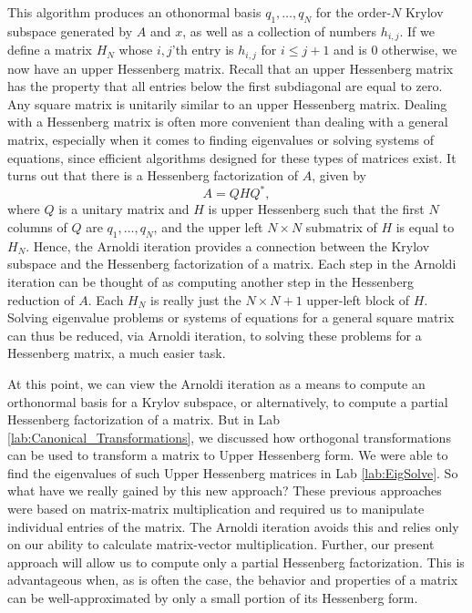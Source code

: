 This algorithm produces an othonormal basis $q_1,\ldots,q_N$ for the order-$N$ Krylov subspace generated by $A$ and $x$, as well
as a collection of numbers $h_{i,j}$. If we define a matrix $H_N$ whose $i,j$'th entry is $h_{i,j}$ for $i \leq j+1$ and
is $0$ otherwise, we now have an upper Hessenberg matrix.
Recall that an upper Hessenberg matrix has the property that all entries below the first subdiagonal
are equal to zero. Any square matrix is unitarily similar to an upper Hessenberg matrix. Dealing with a Hessenberg matrix is
often more convenient than dealing with a general matrix, especially when it comes to finding eigenvalues or solving systems
of equations, since efficient algorithms designed for these types of matrices exist.
It turns out that there is a Hessenberg factorization of $A$, given by
\[
A  = QHQ^*,
\]
where $Q$ is a unitary matrix and $H$ is upper Hessenberg such that the first $N$ columns of $Q$ are $q_1,\ldots,q_N$, and
the upper left $N \times N$ submatrix of $H$ is equal to $H_N$. Hence, the Arnoldi iteration provides a connection between
the Krylov subspace and the Hessenberg factorization of a matrix. Each step in the Arnoldi iteration can be thought of as computing
another step in the Hessenberg reduction of $A$. Each $H_N$ is really just the $N \times N + 1$ upper-left block of $H$.
Solving eigenvalue problems or systems of equations for
a general square matrix can thus be reduced, via Arnoldi iteration, to solving these problems for a Hessenberg matrix,
a much easier task.

At this point, we can view the Arnoldi iteration as a means to compute an orthonormal basis for a Krylov subspace, or
alternatively, to compute a partial Hessenberg factorization of a matrix.
But in Lab \ref{lab:Canonical_Transformations}, we discussed how orthogonal transformations can be used to transform a matrix to Upper
Hessenberg form.
We were able to find the eigenvalues of such Upper Hessenberg matrices in Lab \ref{lab:EigSolve}.
So what have we really gained by this new approach?
These previous approaches were based on matrix-matrix multiplication and required us to manipulate individual entries of the matrix.
The Arnoldi iteration avoids this and relies only on our ability to calculate matrix-vector multiplication.
Further, our present approach will allow us to compute only a partial Hessenberg factorization. This is advantageous when, as
is often the case, the behavior and properties of a matrix can be well-approximated by only a small portion of its Hessenberg
form.

